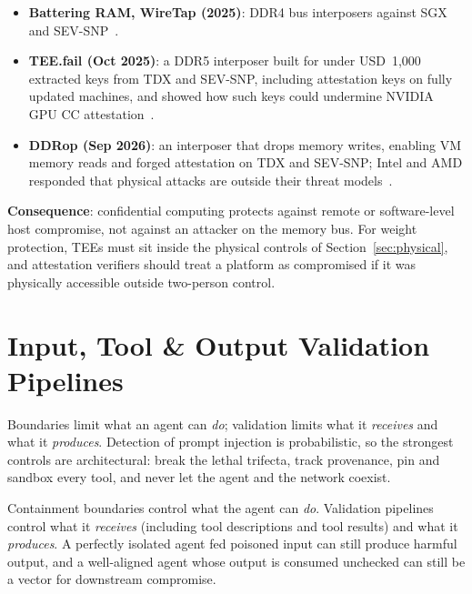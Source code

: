 \documentclass[11pt,letterpaper]{article}
\begin{document}
\begin{dangerbox}
\begin{itemize}
  \item \textbf{Battering RAM, WireTap (2025)}: DDR4 bus interposers against SGX and SEV-SNP~\cite{teefail}.
  \item \textbf{TEE.fail (Oct 2025)}: a DDR5 interposer built for under USD~1,000 extracted keys from TDX and SEV-SNP, including attestation keys on fully updated machines, and showed how such keys could undermine NVIDIA GPU CC attestation~\cite{teefail}.
  \item \textbf{DDRop (Sep 2026)}: an interposer that drops memory writes, enabling VM memory reads and forged attestation on TDX and SEV-SNP; Intel and AMD responded that physical attacks are outside their threat models~\cite{ddrop}.
\end{itemize}
\textbf{Consequence}: confidential computing protects against remote or software-level host compromise, not against an attacker on the memory bus. For weight protection, TEEs must sit inside the physical controls of Section~\ref{sec:physical}, and attestation verifiers should treat a platform as compromised if it was physically accessible outside two-person control.
\end{dangerbox}


\section{Input, Tool \& Output Validation Pipelines}
\label{sec:validation}

\begin{glance}
Boundaries limit what an agent can \emph{do}; validation limits what it \emph{receives} and what it \emph{produces}. Detection of prompt injection is probabilistic, so the strongest controls are architectural: break the lethal trifecta, track provenance, pin and sandbox every tool, and never let the agent and the network coexist.
\end{glance}

Containment boundaries control what the agent can \emph{do}. Validation pipelines control what it \emph{receives} (including tool descriptions and tool results) and what it \emph{produces}. A perfectly isolated agent fed poisoned input can still produce harmful output, and a well-aligned agent whose output is consumed unchecked can still be a vector for downstream compromise.
\end{document}
